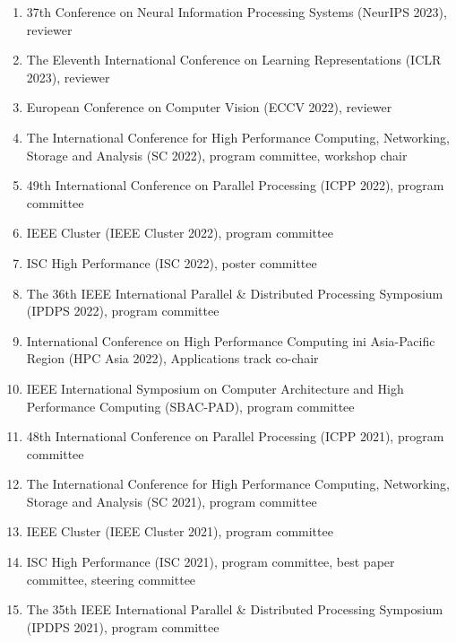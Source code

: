 \documentclass[margin,line]{cv}
\begin{document}
\begin{resume}
\begin{enumerate}
\item 37th Conference on Neural Information Processing Systems (NeurIPS 2023), reviewer

\item The Eleventh International Conference on Learning Representations (ICLR 2023), reviewer

\item European Conference on Computer Vision (ECCV 2022), reviewer

\item The International Conference for High Performance Computing, Networking, Storage and Analysis (SC 2022), program committee, workshop chair

\item 49th International Conference on Parallel Processing (ICPP 2022), program committee

\item IEEE Cluster (IEEE Cluster 2022), program committee

\item ISC High Performance (ISC 2022), poster committee

\item The 36th IEEE International Parallel \& Distributed Processing Symposium (IPDPS 2022), program committee

\item International Conference on High Performance Computing ini Asia-Pacific Region (HPC Asia 2022), Applications track co-chair

\item IEEE International Symposium on Computer Architecture and High Performance Computing (SBAC-PAD), program committee

\item 48th International Conference on Parallel Processing (ICPP 2021), program committee

\item The International Conference for High Performance Computing, Networking, Storage and Analysis (SC 2021), program committee

\item IEEE Cluster (IEEE Cluster 2021), program committee

\item ISC High Performance (ISC 2021), program committee, best paper committee, steering committee

\item The 35th IEEE International Parallel \& Distributed Processing Symposium (IPDPS 2021), program committee


\end{enumerate}
\end{resume}
\end{document}
